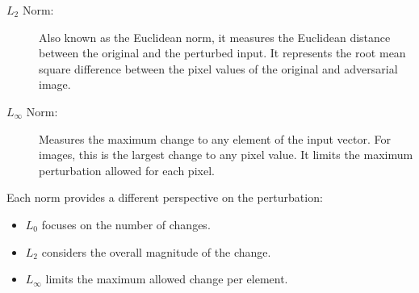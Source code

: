 \documentclass[10pt, conference, a4paper, final]{IEEEtran}
\begin{document}
\begin{description}
    \item[$L_2$ Norm:] Also known as the Euclidean norm, it measures the Euclidean distance between the original and the perturbed input. It represents the root mean square difference between the pixel values of the original and adversarial image.
    \item [$L_{\infty}$ Norm:] Measures the maximum change to any element of the input vector. For images, this is the largest change to any pixel value. It limits the maximum perturbation allowed for each pixel.
\end{description}



Each norm provides a different perspective on the perturbation:
\begin{itemize}
    \item $L_0$ focuses on the number of changes.
    \item $L_2$ considers the overall magnitude of the change.
    \item $L_{\infty}$ limits the maximum allowed change per element.
\end{itemize}
\end{document}
